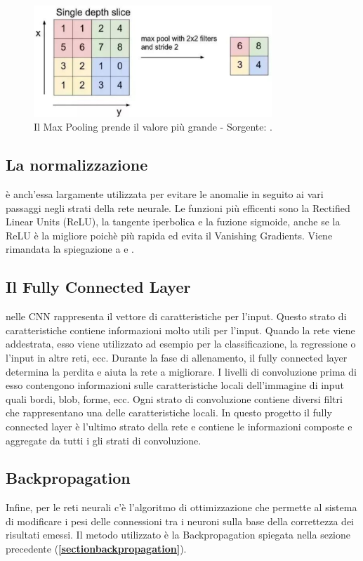 \begin{figure}
\centering
\includegraphics[width=%
0.8\textwidth]{figures/maxpooling}
\caption[Max Pooling.]{Il Max Pooling prende il valore più grande - Sorgente: \cite{CS231n}.
\label{fig:maxpool}}
\end{figure}

\subsection{La normalizzazione} è anch’essa largamente utilizzata per evitare le anomalie in seguito ai vari passaggi negli strati della rete neurale. Le funzioni più efficenti sono la Rectified Linear Units (ReLU), la tangente iperbolica e la fuzione sigmoide, anche se la ReLU è la migliore poichè più rapida ed evita il Vanishing Gradients. Viene rimandata la spiegazione a \cite{Goodfellow-et-al-2016} e \cite{Dahl2013}.

\subsection{Il Fully Connected Layer} nelle CNN rappresenta il vettore di caratteristiche per l'input. Questo strato di caratteristiche contiene informazioni molto utili per l'input. Quando la rete viene addestrata, esso viene utilizzato ad esempio per la classificazione, la regressione o l'input in altre reti, ecc. Durante la fase di allenamento, il fully connected layer determina la perdita e aiuta la rete a migliorare.
I livelli di convoluzione prima di esso contengono informazioni sulle caratteristiche locali dell'immagine di input quali bordi, blob, forme, ecc. Ogni strato di convoluzione contiene diversi filtri che rappresentano una delle caratteristiche locali. In questo progetto il fully connected layer è l'ultimo strato della rete e contiene le informazioni composte e aggregate da tutti i gli strati di convoluzione.

\subsection{Backpropagation} Infine, per le reti neurali c'è l'algoritmo di ottimizzazione che permette al sistema di modificare i pesi delle connessioni tra i neuroni sulla base della correttezza dei risultati emessi. Il metodo utilizzato è la Backpropagation spiegata nella sezione precedente (\textbf{\ref{sectionbackpropagation}}).